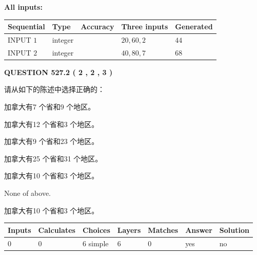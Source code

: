 \documentclass{ctexart}
\begin{document}
   
   
   
\noindent\vspace{0.1in}\hspace{-0.08in} {\textbf{\Large{All inputs: }}}
   
   
  
  
\noindent\begin{tabular}{|l|l|l|l|l|}
\hline
 Sequential & Type & Accuracy & Three inputs & Generated \\ 
\hline
 
 
  INPUT $  1 $ & integer &  & $
 20
 , 
 60
 , 
 2
 $ & $ 44 $ 
 \\  \hline  
 
 
  INPUT $  2 $ & integer &  & $
 40
 , 
 80
 , 
 7
 $ & $ 68 $ 
 \\  \hline  
 \end{tabular}
   
   
  
\vspace{0.2in}
  
{\textbf{\Large{QUESTION
527.2 
 ( 2 , 2 , 3 )
}}}
  
  
请从如下的陈述中选择正确的：
 
 
加拿大有7 个省和9 个地区。
 
 
加拿大有12 个省和3 个地区。
 
 
加拿大有9 个省和23 个地区。
 
 
加拿大有25 个省和31 个地区。
 
 
加拿大有10 个省和3 个地区。
 
 
 None of above.
 
 
\noindent{}
 
 
加拿大有10 个省和3 个地区。
 
 
\noindent{}
 
 
   
   
   
   
\noindent\begin{tabular}{|l|l|l|l|l|l|l|}
 \hline
Inputs & Calculates & Choices & Layers & Matches & Answer & Solution \\ \hline
 0  & 
 0  & 
 6
  simple  
  & 
 6  & 
 0  & 
  yes & 
  no 
  \\ \hline
 \end{tabular}
   
\end{document}

